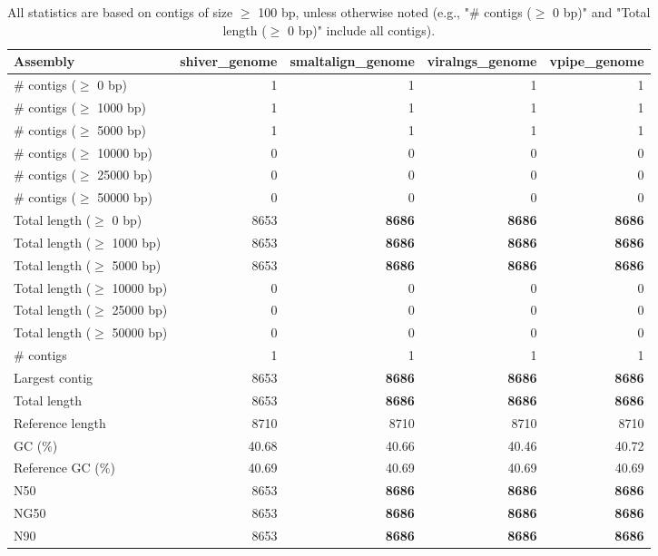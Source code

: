 \documentclass[12pt,a4paper]{article}
\begin{document}
\begin{table}[ht]
\begin{center}
\caption{All statistics are based on contigs of size $\geq$ 100 bp, unless otherwise noted (e.g., "\# contigs ($\geq$ 0 bp)" and "Total length ($\geq$ 0 bp)" include all contigs).}
\begin{tabular}{|l*{4}{|r}|}
\hline
Assembly & shiver\_genome & smaltalign\_genome & viralngs\_genome & vpipe\_genome \\ \hline
\# contigs ($\geq$ 0 bp) & 1 & 1 & 1 & 1 \\ \hline
\# contigs ($\geq$ 1000 bp) & 1 & 1 & 1 & 1 \\ \hline
\# contigs ($\geq$ 5000 bp) & 1 & 1 & 1 & 1 \\ \hline
\# contigs ($\geq$ 10000 bp) & 0 & 0 & 0 & 0 \\ \hline
\# contigs ($\geq$ 25000 bp) & 0 & 0 & 0 & 0 \\ \hline
\# contigs ($\geq$ 50000 bp) & 0 & 0 & 0 & 0 \\ \hline
Total length ($\geq$ 0 bp) & 8653 & {\bf 8686} & {\bf 8686} & {\bf 8686} \\ \hline
Total length ($\geq$ 1000 bp) & 8653 & {\bf 8686} & {\bf 8686} & {\bf 8686} \\ \hline
Total length ($\geq$ 5000 bp) & 8653 & {\bf 8686} & {\bf 8686} & {\bf 8686} \\ \hline
Total length ($\geq$ 10000 bp) & 0 & 0 & 0 & 0 \\ \hline
Total length ($\geq$ 25000 bp) & 0 & 0 & 0 & 0 \\ \hline
Total length ($\geq$ 50000 bp) & 0 & 0 & 0 & 0 \\ \hline
\# contigs & 1 & 1 & 1 & 1 \\ \hline
Largest contig & 8653 & {\bf 8686} & {\bf 8686} & {\bf 8686} \\ \hline
Total length & 8653 & {\bf 8686} & {\bf 8686} & {\bf 8686} \\ \hline
Reference length & 8710 & 8710 & 8710 & 8710 \\ \hline
GC (\%) & 40.68 & 40.66 & 40.46 & 40.72 \\ \hline
Reference GC (\%) & 40.69 & 40.69 & 40.69 & 40.69 \\ \hline
N50 & 8653 & {\bf 8686} & {\bf 8686} & {\bf 8686} \\ \hline
NG50 & 8653 & {\bf 8686} & {\bf 8686} & {\bf 8686} \\ \hline
N90 & 8653 & {\bf 8686} & {\bf 8686} & {\bf 8686} \\ \hline

\end{tabular}
\end{center}
\end{table}
\end{document}
